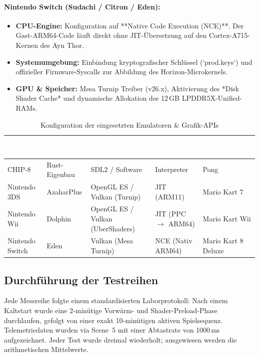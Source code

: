 \documentclass[12pt,a4paper]{scrartcl}
\begin{document}
\paragraph{Nintendo Switch (Sudachi / Citron / Eden):}
\begin{itemize}[leftmargin=1.8em]
    \item \textbf{CPU-Engine:} Konfiguration auf **Native Code Execution (NCE)**. Der Gast-ARM64-Code läuft direkt ohne JIT-Übersetzung auf den Cortex-A715-Kernen des Ayn Thor.
    \item \textbf{Systemumgebung:} Einbindung kryptografischer Schlüssel (`prod.keys`) und offizieller Firmware-Syscalls zur Abbildung des Horizon-Microkernels.
    \item \textbf{GPU \& Speicher:} Mesa Turnip Treiber (v26.x), Aktivierung des *Disk Shader Cache* und dynamische Allokation des 12\,GB LPDDR5X-Unified-RAMs.
\end{itemize}

\begin{table}[htbp]
    \centering
    \small
    \caption{Konfiguration der eingesetzten Emulatoren \& Grafik-APIs}
    \label{tab:emulatoren_config}
    \renewcommand{\arraystretch}{1.25}
    \begin{tabularx}{\linewidth}{|l|l|l|l|X|}
        \hline
        \rowcolor{primaryTeal}
        \textcolor{white}{\textbf{System}} &
        \textcolor{white}{\textbf{Emulator}} &
        \textcolor{white}{\textbf{Grafik-API / Treiber}} &
        \textcolor{white}{\textbf{CPU-Modus}} &
        \textcolor{white}{\textbf{Referenztitel}} \\ \hline
        CHIP-8 & Rust-Eigenbau & SDL2 / Software & Interpreter & Pong \\ \hline
        Nintendo 3DS & AzaharPlus & OpenGL ES / Vulkan (Turnip) & JIT (ARM11) & Mario Kart 7 \\ \hline
        Nintendo Wii & Dolphin & OpenGL ES / Vulkan (UberShaders) & JIT (PPC $\rightarrow$ ARM64) & Mario Kart Wii \\ \hline
        Nintendo Switch & Eden & Vulkan (Mesa Turnip) & NCE (Nativ ARM64) & Mario Kart 8 Deluxe \\ \hline
    \end{tabularx}
\end{table}

\subsection{Durchführung der Testreihen}
Jede Messreihe folgte einem standardisierten Laborprotokoll: Nach einem Kaltstart wurde eine 2-minütige Vorwärm- und Shader-Preload-Phase durchlaufen, gefolgt von einer exakt 10-minütigen aktiven Spielsequenz. Telemetriedaten wurden via Scene~5 mit einer Abtastrate von 1000\,ms aufgezeichnet. Jeder Test wurde dreimal wiederholt; ausgewiesen werden die arithmetischen Mittelwerte.
\end{document}
